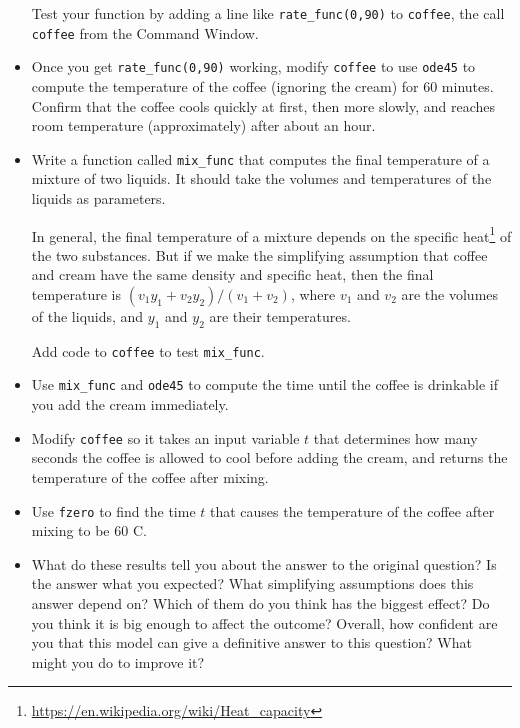 \documentclass{book}
\begin{document}
\begin{ex}
\begin{itemize}
Test your function by adding a line like {\tt rate\_func(0,90)}
to {\tt coffee}, the call {\tt coffee} from the Command Window.

\item Once you get {\tt rate\_func(0,90)} working, modify
{\tt coffee} to use {\tt ode45} to compute the temperature
of the coffee (ignoring the cream) for 60 minutes.  Confirm that
the coffee cools quickly at first, then more slowly, and reaches
room temperature (approximately) after about an hour.

\item Write a function called {\tt mix\_func} that computes
the final temperature of a mixture of two liquids.  It should
take the volumes and temperatures of the liquids as parameters.

In general, the final temperature of a mixture depends on the specific
heat\footnote{\url{https://en.wikipedia.org/wiki/Heat_capacity}}
of the two substances.  But if we make the simplifying
assumption that coffee and cream
have the same density and specific heat, then the final temperature is
$(v_1 y_1 + v_2 y_2) / (v_1 + v_2)$, where $v_1$ and $v_2$ are
the volumes of the liquids, and $y_1$ and $y_2$ are their
temperatures.

Add code to {\tt coffee} to test {\tt mix\_func}.

\item Use {\tt mix\_func} and {\tt ode45} to compute the
time until the coffee is drinkable if you add the cream
immediately.

\item Modify {\tt coffee} so it takes an input variable $t$ that
determines how many seconds the coffee is allowed to cool before
adding the cream, and returns the temperature of the coffee
after mixing.

\item Use {\tt fzero} to find the time $t$ that causes the
temperature of the coffee after mixing to be 60 \degree C.

\item What do these results tell you about the answer to the original
question?  Is the answer what you expected?  What simplifying
assumptions does this answer depend on?  Which of them do you think
has the biggest effect?  Do you think it is big enough to affect the
outcome?  Overall, how confident are you that this model can give
a definitive answer to this question?  What might you do to improve
it?

\end{itemize}

\end{ex}
\end{document}
